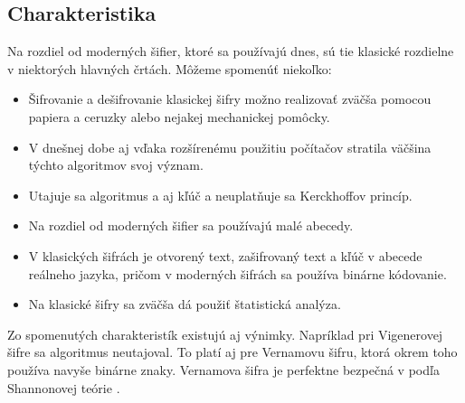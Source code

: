 \subsection{Charakteristika}
Na rozdiel od moderných šifier, ktoré sa používajú dnes, sú tie klasické rozdielne v niektorých hlavných črtách.
Môžeme spomenúť niekoľko:
\begin{itemize}
\item Šifrovanie a dešifrovanie klasickej šifry možno realizovať zväčša pomocou papiera a ceruzky alebo nejakej mechanickej pomôcky.
\item V dnešnej dobe aj vďaka rozšírenému použitiu počítačov stratila väčšina týchto algoritmov svoj význam.
\item Utajuje sa algoritmus a aj kľúč a neuplatňuje sa Kerckhoffov princíp.
\item Na rozdiel od moderných šifier sa používajú malé abecedy.
\item V klasických šifrách je otvorený text, zašifrovaný text a kľúč v abecede reálneho jazyka, pričom v moderných šifrách sa používa binárne kódovanie.
\item Na klasické šifry sa zväčša dá použiť štatistická analýza. 
\end{itemize}
Zo spomenutých charakteristík existujú aj výnimky. Napríklad pri Vigenerovej šifre sa algoritmus neutajoval. To platí aj pre Vernamovu šifru, ktorá okrem toho používa navyše binárne znaky. Vernamova šifra je perfektne bezpečná v podľa Shannonovej teórie \cite{ks}.

